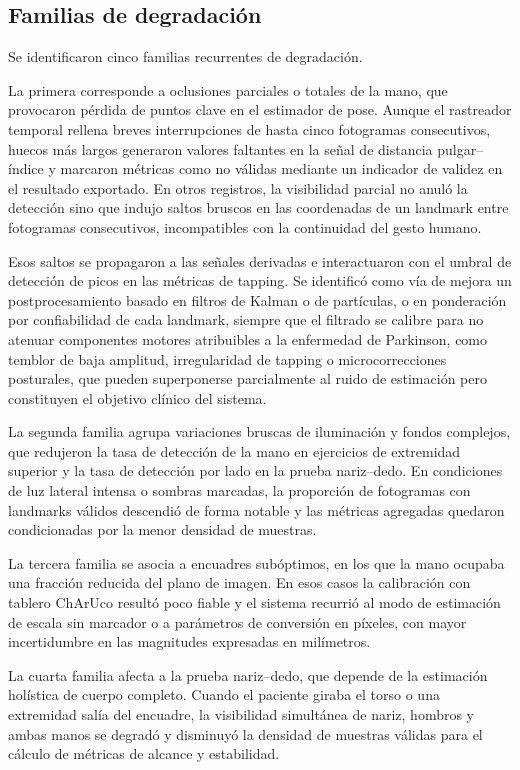 \subsection{Familias de degradación}

Se identificaron cinco familias recurrentes de degradación.

La primera corresponde a oclusiones parciales o totales de la mano, que provocaron pérdida de puntos clave en el estimador de pose. Aunque el rastreador temporal rellena breves interrupciones de hasta cinco fotogramas consecutivos, huecos más largos generaron valores faltantes en la señal de distancia pulgar--índice y marcaron métricas como no válidas mediante un indicador de validez en el resultado exportado. En otros registros, la visibilidad parcial no anuló la detección sino que indujo saltos bruscos en las coordenadas de un landmark entre fotogramas consecutivos, incompatibles con la continuidad del gesto humano.

Esos saltos se propagaron a las señales derivadas e interactuaron con el umbral de detección de picos en las métricas de tapping. Se identificó como vía de mejora un postprocesamiento basado en filtros de Kalman o de partículas, o en ponderación por confiabilidad de cada landmark, siempre que el filtrado se calibre para no atenuar componentes motores atribuibles a la enfermedad de Parkinson, como temblor de baja amplitud, irregularidad de tapping o microcorrecciones posturales, que pueden superponerse parcialmente al ruido de estimación pero constituyen el objetivo clínico del sistema.

La segunda familia agrupa variaciones bruscas de iluminación y fondos complejos, que redujeron la tasa de detección de la mano en ejercicios de extremidad superior y la tasa de detección por lado en la prueba nariz--dedo. En condiciones de luz lateral intensa o sombras marcadas, la proporción de fotogramas con landmarks válidos descendió de forma notable y las métricas agregadas quedaron condicionadas por la menor densidad de muestras.

La tercera familia se asocia a encuadres subóptimos, en los que la mano ocupaba una fracción reducida del plano de imagen. En esos casos la calibración con tablero ChArUco resultó poco fiable y el sistema recurrió al modo de estimación de escala sin marcador o a parámetros de conversión en píxeles, con mayor incertidumbre en las magnitudes expresadas en milímetros.

La cuarta familia afecta a la prueba nariz--dedo, que depende de la estimación holística de cuerpo completo. Cuando el paciente giraba el torso o una extremidad salía del encuadre, la visibilidad simultánea de nariz, hombros y ambas manos se degradó y disminuyó la densidad de muestras válidas para el cálculo de métricas de alcance y estabilidad.

